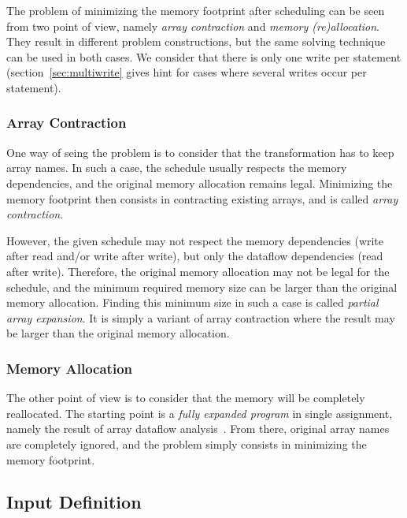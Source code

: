 \documentclass{article}
\begin{document}

The problem of minimizing the memory footprint after scheduling can be seen from
two point of view, namely \emph{array contraction} and \emph{memory
(re)allocation}. They result in different problem constructions, but the same
solving technique can be used in both cases. We consider that there is only one
write per statement (section~\ref{sec:multiwrite} gives hint for cases where
several writes occur per statement).

\subsubsection*{Array Contraction}

One way of seing the problem is to consider that the transformation has to keep
array names. In such a case, the schedule usually respects the memory
dependencies, and the original memory allocation remains legal. Minimizing the
memory footprint then consists in contracting existing arrays, and is called
\emph{array contraction}.

However, the given schedule may not respect the memory dependencies (write after
read and/or write after write), but only the dataflow dependencies (read after
write). Therefore, the original memory allocation may not be legal for the
schedule, and the minimum required memory size can be larger than the original
memory allocation. Finding this minimum size in such a case is called
\emph{partial array expansion}. It is simply a variant of array contraction
where the result may be larger than the original memory allocation.

\subsubsection*{Memory Allocation}

The other point of view is to consider that the memory will be completely
reallocated. The starting point is a \emph{fully expanded program} in single
assignment, namely the result of array dataflow
analysis~\cite{feautrier1991dataflow}. From there, original array names are
completely ignored, and the problem simply consists in minimizing the memory
footprint.

\subsection{Input Definition}
\label{sec:conflict_set}
\end{document}
